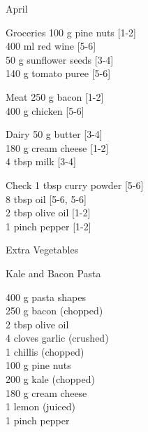 \begin{menu}{April}
\begin{shoppinglist}{Groceries}
      100 g pine nuts 
        {\scriptsize[1-2]}\\
      400 ml red wine 
        {\scriptsize[5-6]}\\
      50 g sunflower seeds 
        {\scriptsize[3-4]}\\
      140 g tomato puree 
        {\scriptsize[5-6]}\\
      \end{shoppinglist}%
      \par\vfil %
      \begin{shoppinglist}{Meat}
      250 g bacon 
        {\scriptsize[1-2]}\\
      400 g chicken 
        {\scriptsize[5-6]}\\
      \end{shoppinglist}%
      \begin{shoppinglist}{Dairy}
      50 g butter 
        {\scriptsize[3-4]}\\
      180 g cream cheese 
        {\scriptsize[1-2]}\\
      4 tbsp milk 
        {\scriptsize[3-4]}\\
      \end{shoppinglist}%
      \par\vfil %
      \vfil\clearpage %
      \begin{shoppinglist}{Check}
      1 tbsp curry powder 
        {\scriptsize[5-6]}\\
      8 tbsp oil 
        {\scriptsize[5-6, 5-6]}\\
      2 tbsp olive oil 
        {\scriptsize[1-2]}\\
      1 pinch pepper 
        {\scriptsize[1-2]}\\
      \end{shoppinglist}%
      \begin{shoppinglist}{Extra Vegetables}
      \end{shoppinglist}%
      \par\vfil %
    \vfil\clearpage
  
    \begin{recipe}{2}{Kale and Bacon Pasta}%
    
		\begin{ingredients}
		400 g pasta shapes  \\
	250 g bacon (chopped) \\
	2 tbsp olive oil  \\
	4 cloves garlic (crushed) \\
	1  chillis (chopped) \\
	100 g pine nuts  \\
	200 g kale (chopped) \\
	180 g cream cheese  \\
	1  lemon (juiced) \\
	1 pinch pepper  \\
	

\end{ingredients}
\end{recipe}
\end{menu}
